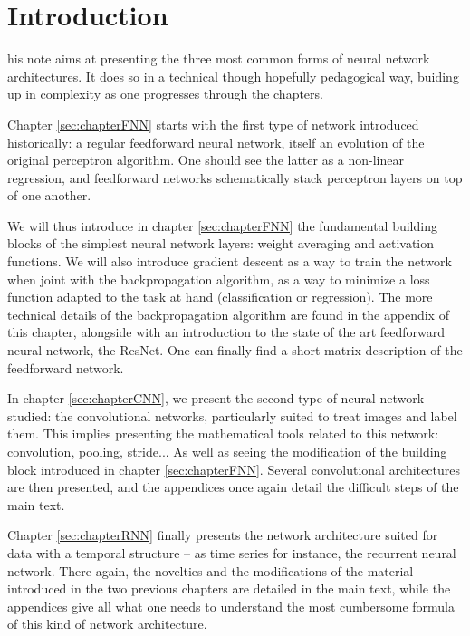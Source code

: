 \chapter{Introduction}

his note aims at presenting the three most common forms of neural network architectures. It does so in a technical though hopefully pedagogical way, buiding up in complexity as one progresses through the chapters. 

\vspace{0.2cm}

Chapter \ref{sec:chapterFNN} starts with the first type of network introduced historically: a regular feedforward neural network, itself an evolution of the original perceptron \cite{Rosenblatt58theperceptron:} algorithm. One should see the latter as a non-linear regression, and feedforward networks schematically stack perceptron layers on top of one another. 

\vspace{0.2cm}

We will thus introduce in chapter \ref{sec:chapterFNN} the fundamental building blocks of the simplest neural network layers: weight averaging and activation functions. We will also introduce gradient descent as a way to train the network when joint with the backpropagation algorithm, as a way to minimize a loss function adapted to the task at hand (classification or regression). The more technical details of the backpropagation algorithm are found in the appendix of this chapter, alongside with an introduction to the state of the art feedforward neural network, the ResNet. One can finally find a short matrix description of the feedforward network.

\vspace{0.2cm}

In chapter \ref{sec:chapterCNN}, we present the second type of neural network studied: the convolutional networks, particularly suited to treat images and label them. This implies presenting the mathematical tools related to this network: convolution, pooling, stride... As well as seeing the modification of the building block introduced in chapter \ref{sec:chapterFNN}. Several convolutional architectures are then presented, and the appendices once again detail the difficult steps of the main text.

\vspace{0.2cm}

Chapter \ref{sec:chapterRNN} finally presents the network architecture suited for data with a temporal structure -- as time series for instance, the recurrent neural network. There again, the novelties and the modifications of the material introduced in the two previous chapters are detailed in the main text, while the appendices give all what one needs to understand the most cumbersome formula of this kind of network architecture. 
